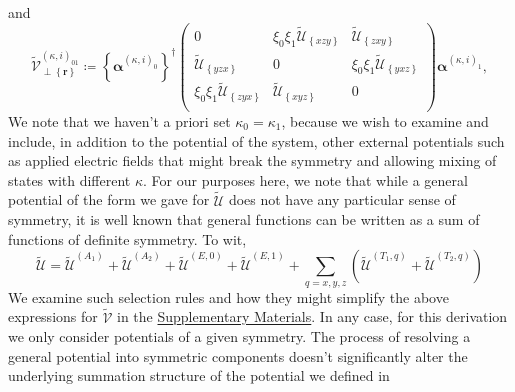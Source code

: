 and
\begin{equation}
\tilde{\mathcal{V}}_{\perp\left\{\bm{r}\right\}}
^{\left(\kappa,i\right)_{01}}
    \coloneqq
        \left\{\bm{\alpha}^{\left(\kappa,i\right)_{0}}\right\}^{\dagger}
        \begin{pmatrix}
            0
            & \xi_{0}\xi_{1}\tilde{\mathcal{U}}_{\left\{xzy\right\}}
            & \tilde{\mathcal{U}}_{\left\{zxy\right\}}
        \\
            \tilde{\mathcal{U}}_{\left\{yzx\right\}}
            & 0
            & \xi_{0}\xi_{1}\tilde{\mathcal{U}}_{\left\{yxz\right\}}
        \\
            \xi_{0}\xi_{1}\tilde{\mathcal{U}}_{\left\{zyx\right\}}
            & \tilde{\mathcal{U}}_{\left\{xyz\right\}}
            & 0
        \\
        \end{pmatrix}
        \bm{\alpha}^{\left(\kappa,i\right)_{1}}
,
\end{equation}
We note that we haven't a priori set $\kappa_{0} = \kappa_{1}$, because we wish
to examine and include, in addition to the potential of the system, other
external potentials such as applied electric fields that might break the
symmetry and allowing mixing of states with different $\kappa$. For our purposes
here, we note that while a general potential of the form we gave for
$\tilde{\mathcal{U}}$ does not have any particular sense of symmetry, it is well
known that general functions can be written as a sum of functions of definite
symmetry. To wit,
\begin{equation}
\tilde{\mathcal{U}}
    =
    \tilde{\mathcal{U}}^{\left(A_{1}\right)}
        +
    \tilde{\mathcal{U}}^{\left(A_{2}\right)}
        +
    \tilde{\mathcal{U}}^{\left(E,0\right)}
        +
    \tilde{\mathcal{U}}^{\left(E,1\right)}
        +
    \sum_{q=x,y,z}
    \left(
        \tilde{\mathcal{U}}^{\left(T_{1},q\right)}
            +
        \tilde{\mathcal{U}}^{\left(T_{2},q\right)}
    \right)
\end{equation}
We examine such selection rules and how they might simplify the above
expressions for $\tilde{\mathcal{V}}$ in the
\href{https://gitlab.com/cantankerous-impurity/Documentation/-/tree/core/SUNY--Buffalo/Dissertation/Supplementary%20Materials?ref_type=heads}{Supplementary Materials}. In any case, for this
derivation we only consider potentials of a given symmetry. The process of
resolving a general potential into symmetric components doesn't significantly
alter the underlying summation structure of the potential we defined in
